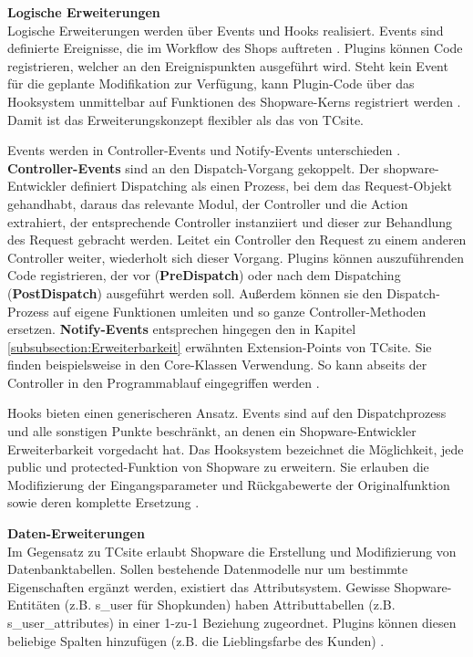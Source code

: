 \documentclass[11pt, a4paper, titlepage, listof=totoc, bibliography=totoc, index=totoc, twoside, openright, headings=normal]{scrreprt}
\begin{document}
\textbf{Logische Erweiterungen}\\
Logische Erweiterungen werden über Events und Hooks realisiert. Events sind \glqq definierte Ereignisse, die im Workflow des Shops auftreten\grqq{} \citep{shopware4Docs}. Plugins können Code registrieren, welcher an den Ereignispunkten ausgeführt wird. Steht kein Event für die geplante Modifikation zur Verfügung, kann Plugin-Code über das Hooksystem unmittelbar auf Funktionen des Shopware-Kerns registriert werden \citep{shopware5Docs}. Damit ist das Erweiterungskonzept flexibler als das von TCsite.

Events werden in Controller-Events und Notify-Events unterschieden \citep{shopware4Docs}. \textbf{Controller-Events} sind an den Dispatch-Vorgang gekoppelt. Der shopware-Entwickler \citet{noegel15Diaspatch} definiert Dispatching als einen Prozess, bei dem das Request-Objekt gehandhabt, daraus das relevante Modul, der Controller und die Action extrahiert, der entsprechende Controller instanziiert und dieser zur Behandlung des Request gebracht werden. Leitet ein Controller den Request zu einem anderen Controller weiter, wiederholt sich dieser Vorgang. Plugins können auszuführenden Code registrieren, der vor (\textbf{PreDispatch}) oder nach dem Dispatching (\textbf{PostDispatch}) ausgeführt werden soll. Außerdem können sie den Dispatch-Prozess auf eigene Funktionen umleiten und so ganze Controller-Methoden ersetzen. \textbf{Notify-Events} entsprechen hingegen den in Kapitel \ref{subsubsection:Erweiterbarkeit} erwähnten Extension-Points von TCsite. Sie finden beispielsweise in den Core-Klassen Verwendung. So kann abseits der Controller in den Programmablauf eingegriffen werden \citep{shopware4Docs}.

Hooks bieten einen generischeren Ansatz. Events sind auf den Dispatchprozess und alle sonstigen Punkte beschränkt, an denen ein Shopware-Entwickler Erweiterbarkeit vorgedacht hat. Das Hooksystem bezeichnet die Möglichkeit, jede public und protected-Funktion von Shopware zu erweitern. Sie erlauben die Modifizierung der Eingangsparameter und Rückgabewerte der Originalfunktion sowie deren komplette Ersetzung \citep{noegel15Hooks}.

\textbf{Daten-Erweiterungen}\\
Im Gegensatz zu TCsite erlaubt Shopware die Erstellung und Modifizierung von Datenbanktabellen. Sollen bestehende Datenmodelle nur um bestimmte Eigenschaften ergänzt werden, existiert das Attributsystem. Gewisse Shopware-Entitäten (z.B. s\_user für Shopkunden) haben Attributtabellen (z.B. s\_user\_attributes) in einer 1-zu-1 Beziehung zugeordnet. Plugins können diesen beliebige Spalten hinzufügen (z.B. die Lieblingsfarbe des Kunden) \citep{shopware5Docs}.
\end{document}
